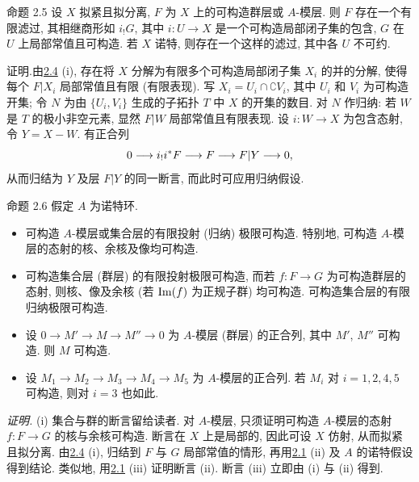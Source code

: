 \begin{enonce*}{命题 2.5}
设 $X$ 拟紧且拟分离, $F$ 为 $X$ 上的可构造群层或 $A$-模层.
则 $F$ 存在一个有限滤过, 其相继商形如 $i_{!}G$,
其中 $i:U\rightarrow X$ 是一个可构造局部闭子集的包含,
$G$ 在 $U$ 上局部常值且可构造.
若 $X$ 诺特, 则存在一个这样的滤过, 其中各 $U$ 不可约.
\end{enonce*}

证明.\pageoriginale 由\hyperref[IX.prop2.4]{2.4} (i),
存在将 $X$ 分解为有限多个可构造局部闭子集 $X_i$ 的并的分解,
使得每个 $F|X_i$ 局部常值且有限 (\resp 有限表现).
写 $X_i=U_i\cap \complement V_i$, 其中 $U_i$ 和 $V_i$ 为可构造开集;
令 $N$ 为由 $\{U_i,V_i\}$ 生成的子拓扑 $T$ 中 $X$ 的开集的数目.
对 $N$ 作归纳: 若 $W$ 是 $T$ 的极小非空元素,
显然 $F|W$ 局部常值且有限表现.
设 $i:W\rightarrow X$ 为包含态射, 令 $Y=X-W$.
有正合列
$$
0\longrightarrow i_{!}i^{\ast}F\longrightarrow F\longrightarrow F|
Y\longrightarrow 0{},
$$
从而归结为 $Y$ 及层 $F| Y$ 的同一断言, 而此时可应用归纳假设.

\begin{enonce*}{命题 2.6}
假定 $A$ 为诺特环.
\begin{itemize}
\item[(i)] 可构造 $A$-模层或集合层的有限投射 (\resp 归纳) 极限可构造.
特别地, 可构造 $A$-模层的态射的核、余核及像均可构造.

\item[(i bis)] 可构造集合层 (\resp 群层) 的有限投射极限可构造,
而若 $f:F\rightarrow G$ 为可构造群层的态射,
则核、像及余核 (若 $\operatorname{Im}(f)$ 为正规子群) 均可构造.
可构造集合层的有限归纳极限可构造.

\item[(ii)] 设 $0\rightarrow M'\rightarrow M\rightarrow
M''\rightarrow 0$ 为 $A$-模层 (\resp 群层) 的正合列,
其中 $M'$, $M''$ 可构造. 则 $M$ 可构造.

\item[(iii)] 设 $M_1\rightarrow M_2\rightarrow M_3\rightarrow
M_4\rightarrow M_5$ 为 $A$-模层的正合列.
若 $M_i$ 对 $i=1,2,4,5$ 可构造, 则对 $i=3$ 也如此.
\end{itemize}
\end{enonce*}

\emph{证明.} (i) 集合与群的断言\pageoriginale 留给读者.
对 $A$-模层, 只须证明可构造 $A$-模层的态射 $f:F\rightarrow G$ 的核与余核可构造.
断言在 $X$ 上是局部的, 因此可设 $X$ 仿射, 从而拟紧且拟分离.
由\hyperref[IX.prop2.4]{2.4} (i), 归结到 $F$ 与 $G$ 局部常值的情形,
再用\hyperref[IX.lem2.1]{2.1} (ii) 及 $A$ 的诺特假设得到结论.
类似地, 用\hyperref[IX.lem2.1]{2.1} (iii) 证明断言 (ii).
断言 (iii) 立即由 (i) 与 (ii) 得到.

